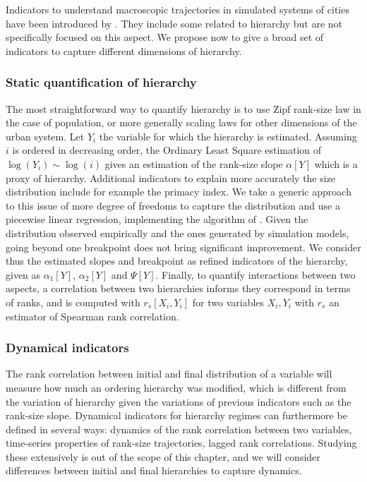 \documentclass[english,fleqn,allpages]{ISTE_science}[2018/07/30]
\begin{document}
Indicators to understand macroscopic trajectories in simulated systems of cities have been introduced by \cite{raimbault2020unveiling}. They include some related to hierarchy but are not specifically focused on this aspect. We propose now to give a broad set of indicators to capture different dimensions of hierarchy.


\subsubsection{Static quantification of hierarchy}

The most straightforward way to quantify hierarchy is to use Zipf rank-size law in the case of population, or more generally scaling laws for other dimensions of the urban system. Let $Y_i$ the variable for which the hierarchy is estimated. Assuming $i$ is ordered in decreasing order, the Ordinary Least Square estimation of $\log \left(Y_i\right) \sim \log \left( i\right)$ gives an estimation of the rank-size slope $\alpha \left[Y\right]$ which is a proxy of hierarchy. Additional indicators to explain more accurately the size distribution include for example the primacy index. We take a generic approach to this issue of more degree of freedoms to capture the distribution and use a piecewise linear regression, implementing the algorithm of \cite{muggeo2003estimating}. Given the distribution observed empirically and the ones generated by simulation models, going beyond one breakpoint does not bring significant improvement. We consider thus the estimated slopes and breakpoint as refined indicators of the hierarchy, given as $\alpha_1 \left[Y\right]$,  $\alpha_2 \left[Y\right]$ and  $\Psi \left[Y\right]$. Finally, to quantify interactions between two aspects, a correlation between two hierarchies informs they correspond in terms of ranks, and is computed with $r_s\left[X_i,Y_i\right]$ for two variables $X_i,Y_i$ with $r_s$ an estimator of Spearman rank correlation.


\subsubsection{Dynamical indicators}

The rank correlation between initial and final distribution of a variable will measure how much an ordering hierarchy was modified, which is different from the variation of hierarchy given the variations of previous indicators such as the rank-size slope. Dynamical indicators for hierarchy regimes can furthermore be defined in several ways: dynamics of the rank correlation between two variables, time-series properties of rank-size trajectories, lagged rank correlations. Studying these extensively is out of the scope of this chapter, and we will consider differences between initial and final hierarchies to capture dynamics.
\end{document}
